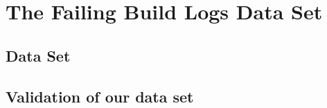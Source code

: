 \documentclass[\myrootdir/main.tex]{subfiles}
\begin{document}
\chapter{The Failing Build Logs Data Set}
\label{data-set}
\section{Data Set}

\section{Validation of our data set}
\end{document}
